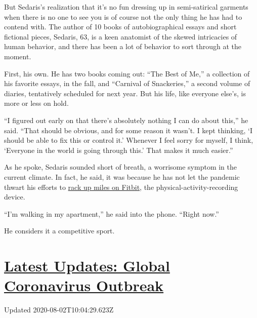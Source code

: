 But Sedaris's realization that it's no fun dressing up in semi-satirical
garments when there is no one to see you is of course not the only thing
he has had to contend with. The author of 10 books of autobiographical
essays and short fictional pieces, Sedaris, 63, is a keen anatomist of
the skewed intricacies of human behavior, and there has been a lot of
behavior to sort through at the moment.

First, his own. He has two books coming out: ``The Best of Me,'' a
collection of his favorite essays, in the fall, and ``Carnival of
Snackeries,'' a second volume of diaries, tentatively scheduled for next
year. But his life, like everyone else's, is more or less on hold.

``I figured out early on that there's absolutely nothing I can do about
this,'' he said. ``That should be obvious, and for some reason it
wasn't. I kept thinking, `I should be able to fix this or control it.'
Whenever I feel sorry for myself, I think, `Everyone in the world is
going through this.' That makes it much easier.''

As he spoke, Sedaris sounded short of breath, a worrisome symptom in the
current climate. In fact, he said, it was because he has not let the
pandemic thwart his efforts to
\href{https://www.newyorker.com/magazine/2014/06/30/stepping-out-3}{rack
up miles on Fitbit}, the physical-activity-recording device.

``I'm walking in my apartment,'' he said into the phone. ``Right now.''

He considers it a competitive sport.

\hypertarget{latest-updates-global-coronavirus-outbreak}{%
\section{\texorpdfstring{\href{https://www.nytimes.com/2020/08/01/world/coronavirus-covid-19.html?action=click\&pgtype=Article\&state=default\&region=MAIN_CONTENT_1\&context=storylines_live_updates}{Latest
Updates: Global Coronavirus
Outbreak}}{Latest Updates: Global Coronavirus Outbreak}}\label{latest-updates-global-coronavirus-outbreak}}

Updated 2020-08-02T10:04:29.623Z

